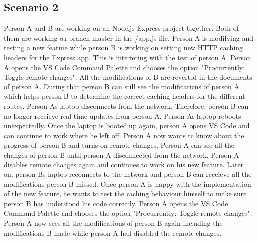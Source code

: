 \subsection{Scenario 2}
Person A and B are working on an Node.js Express project together. Both of them are working on branch master in the /app.js file.
Person A is modifying and testing a new feature while person B is working on setting new HTTP caching headers for the Express app.
This is interfering with the test of person A. Person A opens the VS Code Command Palette and chooses the option "Procurrently: Toggle remote changes".
All the modifications of B are reverted in the documents of person A.
During that person B can still see the modifications of person A which helps person B to determine the correct caching headers for the different routes.
Person As laptop disconnects from the network. Therefore, person B can no longer receieve real time updates from person A.
Person As laptop reboots unexpectedly. Once the laptop is booted up again, person A opens VS Code and can continue to work where he left off.
Person A now wants to know about the progress of person B and turns on remote changes. Person A can see all the changes of person B until person A disconnected from the network. Person A disables remote changes again and continues to work on his new feature.
Later on, person Bs laptop reconnects to the network and person B can receieve all the modifications person B missed.
Once person A is happy with the implementation of the new feature, he wants to test the caching behaviour himself to make sure person B has understood his code correctly.
Person A opens the VS Code Command Palette and chooses the option "Procurrently: Toggle remote changes".
Person A now sees all the modifications of person B again including the modifications B made while person A had disabled the remote changes.